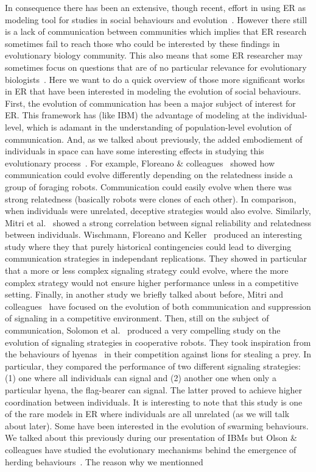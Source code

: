     In consequence there has been an extensive, though recent, effort in using ER as modeling tool for studies in social behaviours and evolution~\parencite{Mitri2012, Trianni2014b, Eiben2014, Doncieux2015a}. However there still is a lack of communication between communities which implies that ER research sometimes fail to reach those who could be interested by these findings in evolutionary biology community. This also means that some ER researcher may sometimes focus on questions that are of no particular relevance for evolutionary biologists~\parencite{Trianni2014b, Doncieux2015a}. Here we want to do a quick overview of those more significant works in ER that have been interested in modeling the evolution of social behaviours. First, the evolution of communication has been a major subject of interest for ER. This framework has (like IBM) the advantage of modeling at the individual-level, which is adamant in the understanding of population-level evolution of communication. And, as we talked about previously, the added embodiement of individuals in space can have some interesting effects in studying this evolutionary process~\parencite{Mitri2009}. For example, Floreano \& colleagues~\parencite{Floreano2007} showed how communication could evolve differently depending on the relatedness inside a group of foraging robots. Communication could easily evolve when there was strong relatedness (basically robots were clones of each other). In comparison, when individuals were unrelated, deceptive strategies would also evolve. Similarly, Mitri et al.~\parencite{Mitri2011} showed a strong correlation between signal reliability and relatedness between individuals. Wischmann, Floreano and Keller~\parencite{Wischmann2012} produced an interesting study where they that purely historical contingencies could lead to diverging communication strategies in independant replications. They showed in particular that a more or less complex signaling strategy could evolve, where the more complex strategy would not ensure higher performance unless in a competitive setting. Finally, in another study we briefly talked about before, Mitri and colleagues~\parencite{Mitri2009} have focused on the evolution of both communication and suppression of signaling in a competitive environment. Then, still on the subject of communication, Solomon et al.~\parencite{Solomon2012} produced a very compelling study on the evolution of signaling strategies in cooperative robots. They took inspiration from the behaviours of hyenas~\parencite{Smith2010} in their competition against lions for stealing a prey. In particular, they compared the performance of two different signaling strategies: (1) one where all individuals can signal and (2) another one when only a particular hyena, the flag-bearer can signal. The latter proved to achieve higher coordination between individuals. It is interesting to note that this study is one of the rare models in ER where individuals are all unrelated (as we will talk about later). Some have been interested in the evolution of swarming behaviours. We talked about this previously during our presentation of IBMs but Olson \& colleagues have studied the evolutionary mechanisms behind the emergence of herding behaviours~\parencite{Olson2013, Olson2013a, Haley2014}. The reason why we mentionned 